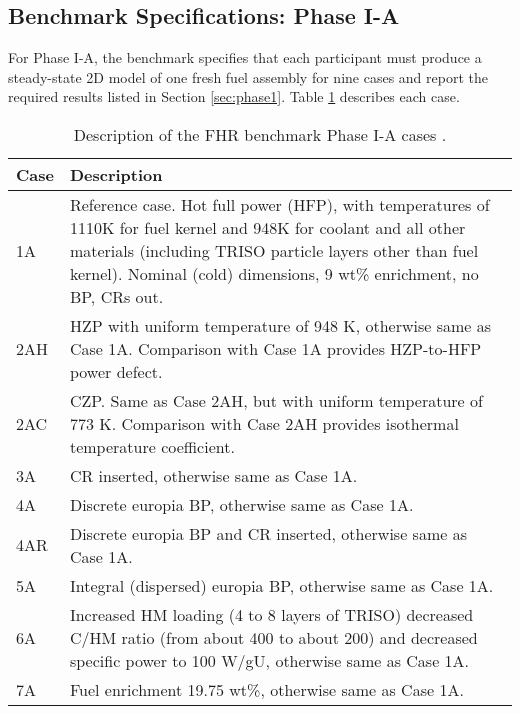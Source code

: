 \subsection{Benchmark Specifications: Phase I-A}
For Phase I-A, the benchmark specifies that each participant must produce a 
steady-state 2D model of one fresh fuel assembly for nine cases
and report the required results listed in Section \ref{sec:phase1}.  
Table \ref{tab:phase1a-cases} describes each case. 
\begin{table}[H]
    \centering
    \onehalfspacing
    \caption{Description of the \acrlong{FHR} benchmark Phase I-A cases \cite{noauthor_fluoride_nodate}.}
	\label{tab:phase1a-cases}
    \footnotesize
    \begin{tabular}{p{}|p{}}
    \hline 
    \textbf{Case} & \textbf{Description} \\
    \hline
    1A & Reference case. Hot full power (HFP), with temperatures of 1110K for 
    fuel kernel and 948K for coolant and all other materials (including TRISO 
    particle layers other than fuel kernel). Nominal (cold) dimensions, 
    9 wt\% enrichment, no \gls{BP}, \glspl{CR} out.\\
    \hline
    2AH & \Gls{HZP} with uniform temperature of 948 K, 
    otherwise same as Case 1A. Comparison with Case 1A provides HZP-to-HFP power 
    defect.\\
    \hline 
    2AC & \Gls{CZP}. Same as Case 2AH, but with uniform temperature 
    of 773 K. Comparison with Case 2AH provides isothermal temperature coefficient.\\
    \hline
    3A & \gls{CR} inserted, otherwise same as Case 1A. \\
    \hline
    4A & Discrete europia \gls{BP}, otherwise same as Case 1A.\\
    \hline
    4AR & Discrete europia \gls{BP} and \gls{CR} inserted, otherwise same as 
    Case 1A. \\
    \hline
    5A & Integral (dispersed) europia \gls{BP}, otherwise same as Case 1A. \\
    \hline
    6A & Increased \gls{HM} loading (4 to 8 layers of \gls{TRISO}) decreased C/HM 
    ratio (from about 400 to about 200) and decreased specific power to 100 W/gU, 
    otherwise same as Case 1A.\\
    \hline 
    7A & Fuel enrichment 19.75 wt\%, otherwise same as Case 1A.\\
    \hline 
    \end{tabular}
\end{table}

